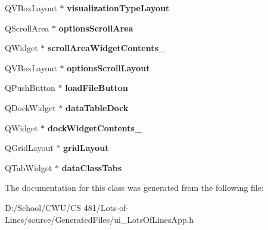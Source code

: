 \begin{DoxyCompactItemize}
\item 
Q\+V\+Box\+Layout $\ast$ {\bfseries visualization\+Type\+Layout}\hypertarget{class_ui___lots_of_lines_app_class_adb78f4619a2c3e0345f02612084dc17a}{}\label{class_ui___lots_of_lines_app_class_adb78f4619a2c3e0345f02612084dc17a}

\item 
Q\+Scroll\+Area $\ast$ {\bfseries options\+Scroll\+Area}\hypertarget{class_ui___lots_of_lines_app_class_a4ef3b74ff7f703281ecc5f6992404e4b}{}\label{class_ui___lots_of_lines_app_class_a4ef3b74ff7f703281ecc5f6992404e4b}

\item 
Q\+Widget $\ast$ {\bfseries scroll\+Area\+Widget\+Contents\+\_}\hypertarget{class_ui___lots_of_lines_app_class_ab73a284f6badcfec7b10533d614b444b}{}\label{class_ui___lots_of_lines_app_class_ab73a284f6badcfec7b10533d614b444b}

\item 
Q\+V\+Box\+Layout $\ast$ {\bfseries options\+Scroll\+Layout}\hypertarget{class_ui___lots_of_lines_app_class_a94ed92b80042db434ca5ebf2df4ba0d7}{}\label{class_ui___lots_of_lines_app_class_a94ed92b80042db434ca5ebf2df4ba0d7}

\item 
Q\+Push\+Button $\ast$ {\bfseries load\+File\+Button}\hypertarget{class_ui___lots_of_lines_app_class_a8eb084892eddbe98ea89badc0528fbad}{}\label{class_ui___lots_of_lines_app_class_a8eb084892eddbe98ea89badc0528fbad}

\item 
Q\+Dock\+Widget $\ast$ {\bfseries data\+Table\+Dock}\hypertarget{class_ui___lots_of_lines_app_class_a94d34d4f3951cb3887cc854900fdbca9}{}\label{class_ui___lots_of_lines_app_class_a94d34d4f3951cb3887cc854900fdbca9}

\item 
Q\+Widget $\ast$ {\bfseries dock\+Widget\+Contents\+\_}\hypertarget{class_ui___lots_of_lines_app_class_ab7b5476d27f06b04e888088487416d10}{}\label{class_ui___lots_of_lines_app_class_ab7b5476d27f06b04e888088487416d10}

\item 
Q\+Grid\+Layout $\ast$ {\bfseries grid\+Layout}\hypertarget{class_ui___lots_of_lines_app_class_a5410f9f7e4f7d905c13d6f91bf5f4a89}{}\label{class_ui___lots_of_lines_app_class_a5410f9f7e4f7d905c13d6f91bf5f4a89}

\item 
Q\+Tab\+Widget $\ast$ {\bfseries data\+Class\+Tabs}\hypertarget{class_ui___lots_of_lines_app_class_ae1baf7fa4580d8846f4e3d4b57e9627b}{}\label{class_ui___lots_of_lines_app_class_ae1baf7fa4580d8846f4e3d4b57e9627b}

\end{DoxyCompactItemize}


The documentation for this class was generated from the following file\+:\begin{DoxyCompactItemize}
\item 
D\+:/\+School/\+C\+W\+U/\+C\+S 481/\+Lots-\/of-\/\+Lines/source/\+Generated\+Files/ui\+\_\+\+Lots\+Of\+Lines\+App.\+h\end{DoxyCompactItemize}
